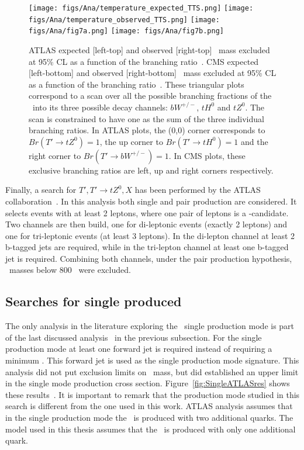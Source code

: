 \begin{figure}[!Hhtbp]
  \begin{center}
    \texttt{[image: figs/Ana/temperature\_expected\_TTS.png]}
    \texttt{[image: figs/Ana/temperature\_observed\_TTS.png]}
    \texttt{[image: figs/Ana/fig7a.png]}
    \texttt{[image: figs/Ana/fig7b.png]}
    \caption{ATLAS expected [left-top] and observed [right-top] \Tp~mass excluded at 95\% CL as a function of the branching ratio~\cite{Aad:2015gdg}. CMS expected [left-bottom] and observed [right-bottom] \Tp~mass excluded at 95\% CL as a function of the branching ratio~\cite{Chatrchyan:2013uxa}. These triangular plots correspond to a scan over all the possible branching fractions of the \Tp~into its three possible decay channels: $bW^{+/-}$, $tH^{0}$ and $tZ^{0}$. The scan is constrained to have one as the sum of the three individual branching ratios. In ATLAS plots, the (0,0) corner corresponds to ${Br(T'\rightarrow tZ^{0})=1}$, the up corner to ${Br(T'\rightarrow tH^{0})=1}$ and the right corner to ${Br(T'\rightarrow bW^{+/-})=1}$. In CMS plots, these exclusive branching ratios are left, up and right corners respectively.}
    \label{fig:ATLASCMSres}
  \end{center}
\end{figure}

Finally, a search for ${T',T'\rightarrow tZ^{0},X}$ has been performed by the ATLAS collaboration~\cite{Aad:2014efa}. In this analysis both single and pair production are considered. It selects events with at least 2 leptons, where one pair of leptons is a \Z-candidate. Two channels are then build, one for di-leptonic events (exactly 2 leptons) and one for tri-leptonic events (at least 3 leptons). In the di-lepton channel at least 2 b-tagged jets are required, while in the tri-lepton channel at least one b-tagged jet is required. Combining both channels, under the pair production hypothesis, \Tp~masses below 800 \GeVcc~were excluded.

\subsection{Searches for single produced \Tp}
\label{sec:singleanal}

The only analysis in the literature exploring the \Tp~single production mode is part of the last discussed analysis~\cite{Aad:2014efa} in the previous subsection. For the single production mode at least one forward jet is required instead of requiring a minimum \HT. This forward jet is used as the single production mode signature. This analysis did not put exclusion limits on \Tp~mass, but did established an upper limit in the single mode production cross section. Figure~\ref{fig:SingleATLASres} shows these results~\cite{Aad:2014efa}. It is important to remark that the production mode studied in this search is different from the one used in this work. ATLAS analysis assumes that in the single production mode the \Tp~is produced with two additional quarks. The model used in this thesis assumes that the \Tp~is produced with only one additional quark.

